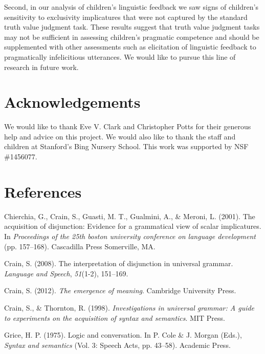 \documentclass[10pt, letterpaper]{article}
\begin{document}
Second, in our analysis of children's linguistic feedback we saw signs
of children's sensitivity to exclusivity implicatures that were not
captured by the standard truth value judgment task. These results
suggest that truth value judgment tasks may not be sufficient in
assessing children's pragmatic competence and should be supplemented
with other assessments such as elicitation of linguistic feedback to
pragmatically infelicitious utterances. We would like to pursue this
line of research in future work.

\section{Acknowledgements}\label{acknowledgements}

We would like to thank Eve V. Clark and Christopher Potts for their
generous help and advice on this project. We would also like to thank
the staff and children at Stanford's Bing Nursery School. This work was
supported by NSF \#1456077.

\section{References}\label{references}

\setlength{\parindent}{-0.1in} \setlength{\leftskip}{0.125in} \noindent

\hypertarget{refs}{}
\hypertarget{ref-chierchia2001acquisition}{}
Chierchia, G., Crain, S., Guasti, M. T., Gualmini, A., \& Meroni, L.
(2001). The acquisition of disjunction: Evidence for a grammatical view
of scalar implicatures. In \emph{Proceedings of the 25th boston
university conference on language development} (pp. 157--168).
Cascadilla Press Somerville, MA.

\hypertarget{ref-crain2008interpretation}{}
Crain, S. (2008). The interpretation of disjunction in universal
grammar. \emph{Language and Speech}, \emph{51}(1-2), 151--169.

\hypertarget{ref-crain2012emergence}{}
Crain, S. (2012). \emph{The emergence of meaning}. Cambridge University
Press.

\hypertarget{ref-crain1998investigations}{}
Crain, S., \& Thornton, R. (1998). \emph{Investigations in universal
grammar: A guide to experiments on the acquisition of syntax and
semantics}. MIT Press.

\hypertarget{ref-grice1975logicconvo}{}
Grice, H. P. (1975). Logic and conversation. In P. Cole \& J. Morgan
(Eds.), \emph{Syntax and semantics} (Vol. 3: Speech Acts, pp. 43--58).
Academic Press.
\end{document}
